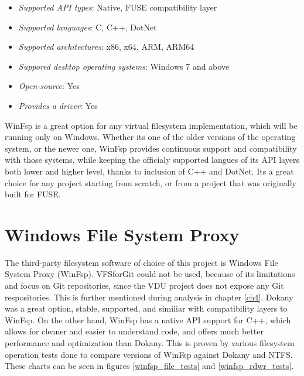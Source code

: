 \begin{itemize}
    \item \textit{Supported API types}: Native, FUSE compatibility layer
    \item \textit{Supported languages}: C, C++, DotNet
    \item \textit{Supported architectures}: x86, x64, ARM, ARM64
    \item \textit{Suppored desktop operating systems}: Windows 7 and above
    \item \textit{Open-source}: Yes
    \item \textit{Provides a driver}: Yes
\end{itemize}

WinFsp is a great option for any virtual filesystem implementation, which will be running only on Windows. Whether its one of the older versions of the operating system, or the newer one, WinFsp provides continuous support and compatibility with those systems, while keeping the officialy supported langues of its API layers both lower and higher level, thanks to inclusion of C++ and DotNet. Its a great choice for any project starting from scratch, or from a project that was originally built for FUSE.\cite{GitWinFsp}

\section{Windows File System Proxy}

The third-party filesystem software of choice of this project is Windows File System Proxy (WinFsp). VFSforGit could not be used, because of its limitations and focus on Git repositories, since the VDU project does not expose any Git respositories. This is further mentioned during analysis in chapter \ref{ch4}. Dokany was a great option, stable, supported, and similiar with compatibility layers to WinFsp. On the other hand, WinFsp has a native API support for C++, which allows for cleaner and easier to understand code, and offers much better performance and optimization than Dokany. This is proven by various filesystem operation tests done to compare versions of WinFsp against Dokany and NTFS. These charts can be seen in figures \ref{winfsp_file_tests} and \ref{winfsp_rdwr_tests}.


